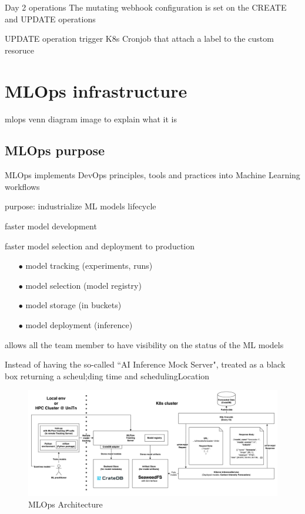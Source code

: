 Day 2 operations
The mutating webhook configuration is set on the CREATE and UPDATE operations

UPDATE operation trigger
K8s Cronjob that attach a label to the custom resoruce 

\newpage


\section{MLOps infrastructure}

mlops venn diagram image
to explain what it is

\subsection{MLOps purpose}

MLOps implements DevOps principles, tools and practices into Machine Learning workflows 


purpose: industrialize ML models lifecycle

faster model development

faster model selection and deployment to production

\begin{itemize}[itemsep=0.2pt, topsep=1pt]
  \item[$\bullet$] model tracking (experiments, runs)
  \item[$\bullet$] model selection (model registry)
  \item[$\bullet$] model storage (in buckets)
  \item[$\bullet$] model deployment (inference)
\end{itemize}


allows all the team member to have visibility on the status of the ML models

Instead of having the so-called ``AI Inference Mock Server", treated as a black box returning a scheul;ding time and schedulingLocation

\begin{figure}[htb]
\centering
\includegraphics[width=1\linewidth]{images/mlops_workflow.png}
\caption{MLOps Architecture}
\label{fig:mlops}
\end{figure}


